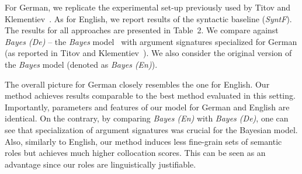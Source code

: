 For German, we replicate the experimental set-up previously
used by Titov and Klementiev~\citet{TitovAcl2012}. As for English,
we report results of the syntactic baseline ({\em SyntF}).  
The results for all approaches are presented in Table~2.
We compare against {\em Bayes (De)} -- the {\em Bayes} model~
with argument signatures specialized for German (as reported in Titov and
Klementiev~\citet{TitovAcl2012}).
We also consider the original version of the {\em Bayes} model (denoted as {\em Bayes (En)}). 

The overall picture for German closely resembles the one for English. Our method achieves results comparable to
the best method evaluated in this setting. 
Importantly, parameters and features of our model for German and English are identical. 
On the contrary, by comparing  {\em Bayes (En)} with {\em Bayes (De)},  one can see that specialization of argument
signatures was crucial for the Bayesian model.  Also, similarly to English, our method induces less fine-grain sets of semantic roles but achieves
much higher collocation scores. This can be seen as an advantage since our roles
are linguistically justifiable.




